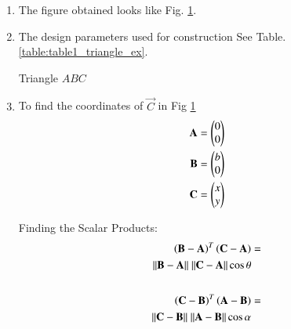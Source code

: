 \renewcommand{\theequation}{\theenumi}
\begin{enumerate}[label=\thesubsection.\arabic*.,ref=\thesubsection.\theenumi]

\begin{figure}[!ht]
\centering
\resizebox{\columnwidth}{!}{}
\caption{Triangle by Latex-Tikz}
\label{fig:triangle_triangle_ex}	
\end{figure}

\item The figure obtained looks like Fig. \ref{fig:triangle_triangle_ex}.\\ 

\item The design parameters used for construction See Table. \ref{table:table1_triangle_ex}.
\begin{table}[ht!]
\centering

\caption{Triangle $ABC$}
\label{table:table1_triangle_ex}	
\end{table} 

\item To find the coordinates of $\vec{C}$ in Fig \ref{fig:triangle_triangle_ex}\\
\solution
\begin{align}
\mathbf{A} &=\begin{pmatrix}0\\0\end{pmatrix} \label{eq:constr_a_triangle_ex}\\
\mathbf{B} &=\begin{pmatrix}b\\0\end{pmatrix} \label{eq:constr_b_triangle_ex}\\
\mathbf{C} &=\begin{pmatrix}x\\y\end{pmatrix} \label{eq:constr_c_triangle_ex}
\end{align}

Finding the Scalar Products:
\begin{align}
\begin{split}\label{eq:scalar1_triangle_ex}
\left(\mathbf{B} - \mathbf{A}\right)^T\left(\mathbf{C}-\mathbf{A}\right) &= \\ \|\mathbf{B} - \mathbf{A}\|
\ \| \mathbf{C}-\mathbf{A} \| \cos{\theta}
\end{split}\\ \nonumber\\
\begin{split}\label{eq:scalar2_triangle_ex}
\left(\mathbf{C} - \mathbf{B}\right)^T\left(\mathbf{A}-\mathbf{B}\right) &= \\ 
\|\mathbf{C} - \mathbf{B}\|\ \| \mathbf{A}-\mathbf{B} \| \cos{\alpha}
\end{split}
\end{align}


\end{enumerate}
